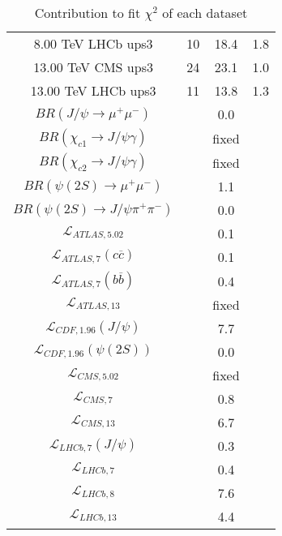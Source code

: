 \begin{table}[h!]
\begin{tabular}{c|c|c|c}
8.00 TeV LHCb ups3 & 10 & 18.4 & 1.8 \\
13.00 TeV CMS ups3 & 24 & 23.1 & 1.0 \\
13.00 TeV LHCb ups3 & 11 & 13.8 & 1.3 \\
\hline
$BR(J/\psi\rightarrow\mu^+\mu^-)$ &  & 0.0 &  \\
$BR(\chi_{c1}\rightarrow J/\psi\gamma)$ &  & fixed & \\
$BR(\chi_{c2}\rightarrow J/\psi\gamma)$ &  & fixed & \\
$BR(\psi(2S)\rightarrow\mu^+\mu^-)$ &  & 1.1 &  \\
$BR(\psi(2S)\rightarrow J/\psi\pi^+\pi^-)$ &  & 0.0 &  \\
$\mathcal L_{ATLAS,5.02}$ &  & 0.1 &  \\
$\mathcal L_{ATLAS,7}(c\overline c)$ &  & 0.1 &  \\
$\mathcal L_{ATLAS,7}(b\overline b)$ &  & 0.4 &  \\
$\mathcal L_{ATLAS,13}$ &  & fixed & \\
$\mathcal L_{CDF,1.96}(J/\psi)$ &  & 7.7 &  \\
$\mathcal L_{CDF,1.96}(\psi(2S))$ &  & 0.0 &  \\
$\mathcal L_{CMS,5.02}$ &  & fixed & \\
$\mathcal L_{CMS,7}$ &  & 0.8 &  \\
$\mathcal L_{CMS,13}$ &  & 6.7 &  \\
$\mathcal L_{LHCb,7}(J/\psi)$ &  & 0.3 &  \\
$\mathcal L_{LHCb,7}$ &  & 0.4 &  \\
$\mathcal L_{LHCb,8}$ &  & 7.6 &  \\
$\mathcal L_{LHCb,13}$ &  & 4.4 &  \\
\end{tabular}
\caption{Contribution to fit $\chi^2$ of each dataset}
\end{table}
